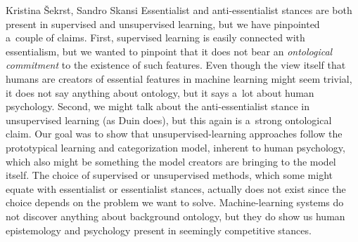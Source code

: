 \begin{artengenv2auth}{Kristina Šekrst, Sandro Skansi}
Essentialist and anti-essentialist stances are both present in supervised and unsupervised learning, but we have pinpointed a~couple of claims. First, supervised learning is easily connected with essentialism, but we wanted to pinpoint that it does not bear an \textit{ontological commitment} to the existence of such features. Even though the view itself that humans are creators of essential features in machine learning might seem trivial, it does not say anything about ontology, but it says a~lot about human psychology. Second, we might talk about the anti-essentialist stance in unsupervised learning (as Duin
\parencite*[][]{duin_dissimilarity_2015} %
 does), but this again is a~strong ontological claim. Our goal was to show that unsupervised-learning approaches follow the prototypical learning and categorization model, inherent to human psychology, which also might be something the model creators are bringing to the model itself. The choice of supervised or unsupervised methods, which some might equate with essentialist or essentialist stances, actually does not exist since the choice depends on the problem we want to solve. Machine-learning systems do not discover anything about background ontology, but they do show us human epistemology and psychology present in seemingly competitive stances.
 
 


\end{artengenv2auth}

